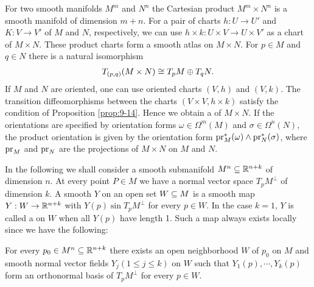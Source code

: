 \begin{remark}\label{remark:9-20}
  For two smooth manifolds $M^m$ and $N^n$ the Cartesian product $M^m\times N^n$ is a smooth 
  manifold of dimension $m+n$. For a pair of charts $h:U\to U'$
  and $K:V\to V'$ of $M$ and $N$, respectively, we can use $h\times k:U\times V\to U\times V'$
  as a chart of $M\times N$. These product charts form a smooth atlas on $M\times N$. For
  $p\in M$ and $q\in N$ there is a natural isomorphism  
  \begin{align*}
    T_{(p, q)}(M\times N) \cong T_pM \oplus T_qN.
  \end{align*}
  If $M$ and $N$ are oriented, one can use oriented charts $(V, h)$ and $(V, k)$. The transition 
  diffeomorphisms between the charts $(V\times V , h\times k)$ satisfy the condition
  of Proposition \ref{prop:9-14}. Hence we obtain a  of $M\times N$. If the
  orientations are specified by orientation forms $\omega\in\Omega^m(M)$ and $\sigma\in\Omega^n(N)$, 
  the product orientation is given by the orientation form $\mathrm{pr}^*_M(\omega)\wedge\mathrm{pr}^*_N(\sigma)$, 
  where $\mathrm{pr}_M$ and $\mathrm{pr}_N$ are the projections of $M\times N$ on $M$ and $N$.
\end{remark}

In the following we shall consider a smooth submanifold $M^n\subseteq \mathbb{R}^{n+k}$ of
dimension $n$. At every point $P\in M$ we have a normal vector space $T_pM^\perp$ of 
dimension $k$. A smooth  $Y$ on an open set $W\subseteq M$ is a
smooth map $Y:W\to\mathbb{R}^{n+k}$ with $Y(p)\sin T_pM^\perp$ for every $p\in W$. In the case
$k = 1$, $Y$ is called a  on $W$ when all $Y(p)$ have length 1. Such a map
always exists locally since we have the following:

\begin{lemma}\label{lemma:9-21}
  For every $p_0\in M^n\subseteq \mathbb{R}^{n+k}$ there exists an open neighborhood
$W$ of $p_0$ on $M$ and smooth normal vector fields $Y_j(1\le j\le k)$ on $W$ such that
$Y_1(p), \cdots, Y_k(p)$ form an orthonormal basis of $T_pM^\perp$ for every $p\in W$.
\end{lemma}

